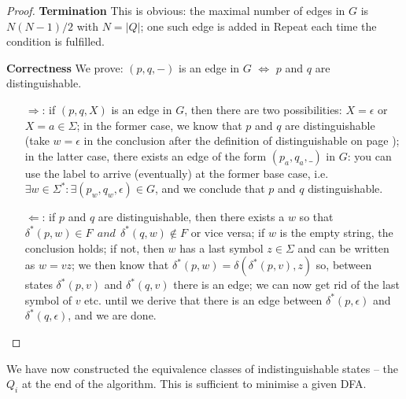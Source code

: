 \begin{proof}
\textbf{Termination}\hspace{0.75em} This is obvious: the maximal number of
edges in $G$ is $N(N-1)/2$ with $N=|Q|$; one such edge is added in
Repeat each time the condition is fulfilled.

\textbf{Correctness}\hspace{0.75em} We prove: $(p,q,-)$ is an edge in $G$ $\Leftrightarrow$ $p$ and $q$ are distinguishable.

\begin{itemize}
\item[$\Rightarrow$:] if $(p,q,X)$ is an edge in $G$, then
there are two possibilities: $X = \epsilon$ or $X = a \in \Sigma$; in
the former case, we know that $p$ and $q$ are distinguishable (take
$w = \epsilon$ in the conclusion after the definition of
distinguishable on page \pageref{gelijk}); in the latter case, there
exists an edge of the form $(p_a,q_a,\_)$ in $G$: you can use the
label to arrive (eventually) at the former base case, i.e.
%
$\exists w \in \Sigma^* : \exists (p_w,q_w,\epsilon) \in G$, and we
conclude that $p$ and $q$ distinguishable.

\item[$\Leftarrow$:] if $p$ and $q$ are distinguishable, then
there exists a $w$ so that $\delta^*(p,w) \in F~~and~~\delta^*(q,w)
\notin F$ or vice versa; if $w$ is the empty string, the conclusion
holds; if not, then $w$ has a last symbol $z \in \Sigma$ and can be
written as $w = vz$; we then know that $\delta^*(p,w) =
\delta(\delta^*(p,v),z)$ so, between states $\delta^*(p,v)$ and
$\delta^*(q,v)$ there is an edge; we can now get rid of the last
symbol of $v$ etc. until we derive that there is an edge between
$\delta^*(p,\epsilon)$ and $\delta^*(q,\epsilon)$, and we are done.\vspace{-2em}
\end{itemize}
\end{proof}

We have now constructed the equivalence classes of indistinguishable
states -- the $Q_i$ at the end of the algorithm. This is sufficient to minimise a given DFA.

